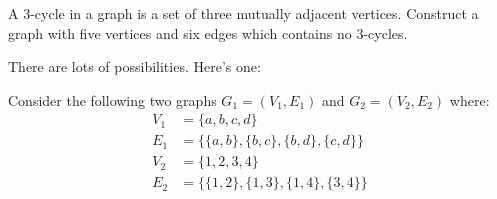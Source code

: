 \begin{questions}
\question
  A 3-cycle in a graph is a set of three mutually adjacent vertices.
  Construct a graph with five vertices and six edges which contains no 3-cycles.~\cite{biggs02}

	\begin{solution}
		There are lots of possibilities. Here's one:
		\begin{center}
  	 \begin{adjustbox}{max width=0.6\textwidth}
			\end{adjustbox}
		\end{center}

	\end{solution}

\question
  Consider the following two graphs $G_1 = (V_1,E_1)$ and $G_2 = (V_2,E_2)$ where:
  \begin{align*}
    V_1 &= \{a,b,c,d\} \\
    E_1 &= \{\{a,b\},\{b,c\},\{b,d\},\{c,d\}\}\\
    V_2 &= \{1,2,3,4\} \\
    E_2 &= \{\{1,2\},\{1,3\},\{1,4\},\{3,4\}\}
  \end{align*}

  \begin{parts}

\end{parts}
\end{questions}
